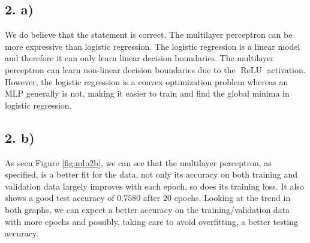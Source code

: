 \documentclass[11pt]{article}
\DeclareMathOperator{\relu}{ReLU}
\begin{document}
\subsection{2. a)}
We do believe that the statement is correct.
The multilayer perceptron can be more expressive than logistic regression.
The logistic regression is a linear model and therefore it can only learn linear decision boundaries.
The multilayer perceptron can learn non-linear decision boundaries due to the $\relu$ activation.
However, the logistic regression is a convex optimization problem whereas an MLP generally is not, making it easier to train and find the global minima in logistic regression.

\subsection{2. b)}
As seen Figure \ref{fig:mlp2b}, we can see that the multilayer perceptron, as specified, is a better fit for the data, not only its accuracy on both training and validation data largely improves with each epoch, so does its training loss. It also shows a good test accuracy of $0.7580$ after $20$ epochs. Looking at the trend in both graphs, we can expect a better accuracy on the training/validation data with more epochs and possibly, taking care to avoid overfitting, a better testing accuracy.
\end{document}
